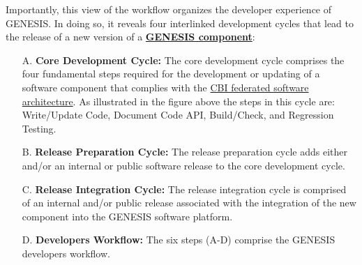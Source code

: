 \documentclass[12pt]{article}
\begin{document}
Importantly, this view of the workflow organizes the developer experience of GENESIS. In doing so, it reveals four interlinked development cycles that lead to the release of a new version of a \href{../reserved-words/reserved-words.tex}{\bf GENESIS component}:
\begin{itemize}
   \item[A.]{\bf Core Development Cycle:} The core development cycle comprises the four fundamental steps required for the development or updating of a software component that complies with the \href{../genesis-overview/genesis-overview.tex}{CBI federated software architecture}. As illustrated in the figure above the steps in this cycle are: Write/Update Code, Document Code API, Build/Check, and Regression Testing.
   \item[B.]{\bf Release Preparation Cycle:} The release preparation cycle adds either and/or an internal or public software release to the core development cycle.
   \item[C.]{\bf Release Integration Cycle:} The release integration cycle is comprised of an internal and/or public release associated with the integration of the new component into the GENESIS software platform.
   \item[D.]{\bf Developers Workflow:} The six steps (A-D) comprise the GENESIS developers workflow.
\end{itemize}
\end{document}
